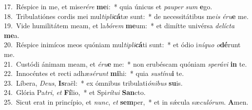 {17.~}Réspice in me, et mise\textit{ré}\textit{re} \textbf{me}i:~* quia únicus et \textit{pau}\textit{per} \textit{sum} \textbf{e}go.\\
{18.~}Tribulatiónes cordis mei mul\textit{ti}\textit{pli}\textbf{cá}tæ sunt:~* de necessitátibus me\textit{is} \textit{é}\textit{ru}\textbf{e} me.\\
{19.~}Vide humilitátem meam, et la\textit{bó}\textit{rem} \textbf{me}um:~* et dimítte univérsa \textit{de}\textit{lí}\textit{cta} \textbf{me}a.\\
{20.~}Réspice inimícos meos quóniam mul\textit{ti}\textit{pli}\textbf{cá}ti sunt:~* et ódio i\textit{ní}\textit{quo} \textit{o}\textbf{dé}runt me.\\
{21.~}Custódi ánimam meam, et \textit{é}\textit{ru}\textbf{e} me:~* non erubéscam quóniam \textit{spe}\textit{rá}\textit{vi} \textbf{in} te.\\
{22.~}Innocéntes et recti adhæ\textit{sé}\textit{runt} \textbf{mi}hi:~* quia \textit{su}\textit{stí}\textit{nu}\textbf{i} te.\\
{23.~}Líbera, \textit{De}\textit{us}, \textbf{Is}raël:~* ex ómnibus tribulati\textit{ó}\textit{ni}\textit{bus} \textbf{su}is.\\
{24.~}Glória Pa\textit{tri}, \textit{et} \textbf{Fí}lio,~* et Spi\textit{rí}\textit{tu}\textit{i} \textbf{San}cto.\\
{25.~}Sicut erat in princípio, et \textit{nunc}, \textit{et} \textbf{sem}per,~* et in sǽcula sæ\textit{cu}\textit{ló}\textit{rum}. \textbf{A}men.\\
